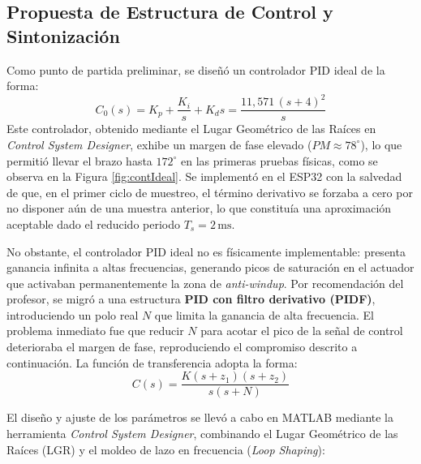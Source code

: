 \subsection{Propuesta de Estructura de Control y Sintonización}
Como punto de partida preliminar, se diseñó un controlador PID ideal de la forma:
\begin{equation}
  C_0(s) = K_p + \frac{K_i}{s} + K_d s = \frac{11{,}571\,(s+4)^2}{s}
\end{equation}
Este controlador, obtenido mediante el Lugar Geométrico de las Raíces en \textit{Control System Designer}, exhibe un margen de fase elevado ($PM \approx 78^\circ$), lo que permitió llevar el brazo hasta $172^\circ$ en las primeras pruebas físicas, como se observa en la Figura \ref{fig:contIdeal}. Se implementó en el ESP32 con la salvedad de que, en el primer ciclo de muestreo, el término derivativo se forzaba a cero por no disponer aún de una muestra anterior, lo que constituía una aproximación aceptable dado el reducido periodo $T_s = 2\,\mathrm{ms}$.


No obstante, el controlador PID ideal no es físicamente implementable: presenta ganancia infinita a altas frecuencias, generando picos de saturación en el actuador que activaban permanentemente la zona de \textit{anti-windup}. Por recomendación del profesor, se migró a una estructura \textbf{PID con filtro derivativo (PIDF)}, introduciendo un polo real $N$ que limita la ganancia de alta frecuencia. El problema inmediato fue que reducir $N$ para acotar el pico de la señal de control deterioraba el margen de fase, reproduciendo el compromiso descrito a continuación. La función de transferencia adopta la forma:
\begin{equation}
  C(s) = \frac{K(s + z_1)(s + z_2)}{s(s + N)}
  \label{eq:PIDF_zeros}
\end{equation}

El diseño y ajuste de los parámetros se llevó a cabo en MATLAB mediante la herramienta \textit{Control System Designer}, combinando el Lugar Geométrico de las Raíces (LGR) y el moldeo de lazo en frecuencia (\textit{Loop Shaping}):

